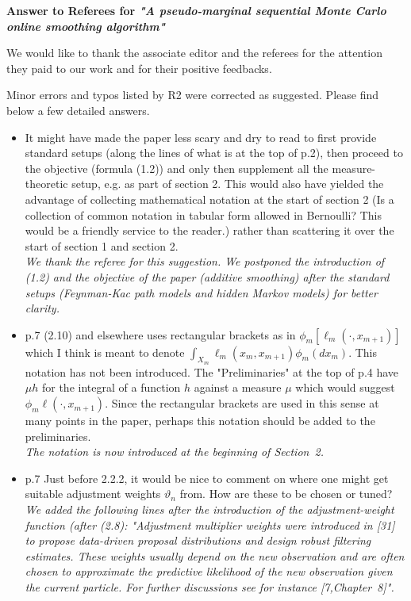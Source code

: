 \documentclass[12pt]{amsart}
\begin{document}
\begin{center}
\textbf{Answer to Referees for \textit{"A pseudo-marginal sequential Monte Carlo online smoothing algorithm"}}
\end{center}

\bigskip

We would like to thank the associate editor and the referees for the attention they paid to our work and for their positive feedbacks. 

\bigskip

Minor errors and typos listed by R2 were corrected as suggested. Please find below a few detailed answers.


\begin{itemize}
\item It might have made the paper less scary and dry to read to first provide standard setups (along the lines of what is at the top of p.2), then proceed to the objective (formula (1.2)) and only then supplement all the measure-theoretic setup, e.g. as part of section 2. This would also have yielded the advantage of collecting mathematical notation at the start of section 2 (Is a collection of common notation in tabular form allowed in Bernoulli? This would be a friendly service to the reader.) rather than scattering it over the start of section 1 and section 2.\\
{\em We thank the referee for this suggestion. We postponed the introduction of (1.2)  and the objective of the paper (additive smoothing) after the standard setups (Feynman-Kac path models and hidden Markov models) for better clarity.}
\item p.7 (2.10) and elsewhere uses rectangular brackets as in $\phi_m[\ell_m(\cdot,x_{m+1})]$ which I think is meant to denote $\int_{X_m}\ell_m(x_m,x_{m+1})\phi_m(dx_m)$. This notation has not been introduced. The "Preliminaries" at the top of p.4 have $\mu h$ for the integral of a function $h$ against a measure $\mu$ which would suggest $\phi_m \ell(\cdot,x_{m+1})$. Since the rectangular brackets are used in this sense at many points in the paper, perhaps this notation should be added to the preliminaries.\\
{\em The notation is now introduced at the beginning of Section~2. }
\item p.7 Just before 2.2.2, it would be nice to comment on where one might get suitable adjustment weights $\vartheta_n$ from. How are these to be chosen or tuned?\\
{\em We added the following lines after the introduction of the adjustment-weight function (after (2.8): "Adjustment multiplier weights were introduced in [31] to propose data-driven proposal distributions and design robust filtering estimates. These weights usually depend on the new observation and are often chosen to approximate the predictive likelihood of the new observation given the current particle. For further discussions see for instance [7,Chapter~8]".}

\end{itemize}
\end{document}
